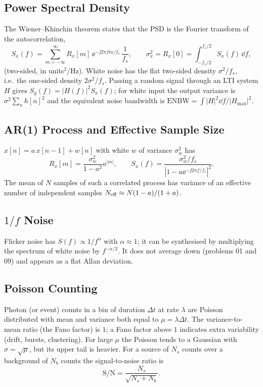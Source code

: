 \documentclass[11pt,a4paper]{article}
\begin{document}
\subsection{Power Spectral Density}
The Wiener--Khinchin theorem states that the PSD is the Fourier transform of the autocorrelation,
\begin{equation}
  S_x(f)=\sum_{m=-\infty}^{\infty}R_x[m]\,\ee^{-\jj2\pi fm/f_s}\,\frac1{f_s},\qquad
  \sigma_x^2=R_x[0]=\int_{-f_s/2}^{f_s/2}S_x(f)\,\dd f,
  \label{eq:wk}
\end{equation}
(two-sided, in units$^2$/Hz). White noise has the flat two-sided density $\sigma^2/f_s$, i.e.\ the one-sided density $2\sigma^2/f_s$. Passing a random signal through an LTI system $H$ gives $S_y(f)=|H(f)|^2S_x(f)$; for white input the output variance is $\sigma^2\sum_n h[n]^2$ and the equivalent noise bandwidth is $\mathrm{ENBW}=\int|H|^2\dd f/|H_{\max}|^2$.

\subsection{AR(1) Process and Effective Sample Size}
$x[n]=a\,x[n-1]+w[n]$ with white $w$ of variance $\sigma_w^2$ has
\begin{equation}
  R_x[m]=\frac{\sigma_w^2}{1-a^2}a^{|m|},\qquad S_x(f)=\frac{\sigma_w^2/f_s}{|1-a\ee^{-\jj2\pi f/f_s}|^2}.
  \label{eq:ar1}
\end{equation}
The mean of $N$ samples of such a correlated process has variance of an effective number of independent samples $N_{\rm eff}\approx N(1-a)/(1+a)$.

\subsection{$1/f$ Noise}
Flicker noise has $S(f)\propto1/f^{\alpha}$ with $\alpha\approx1$; it can be synthesised by multiplying the spectrum of white noise by $f^{-\alpha/2}$. It does not average down (problems 01 and 09) and appears as a flat Allan deviation.

\subsection{Poisson Counting}
Photon (or event) counts in a bin of duration $\Delta t$ at rate $\lambda$ are Poisson distributed with mean and variance both equal to $\mu=\lambda\Delta t$. The variance-to-mean ratio (the Fano factor) is $1$; a Fano factor above $1$ indicates extra variability (drift, bursts, clustering). For large $\mu$ the Poisson tends to a Gaussian with $\sigma=\sqrt\mu$, but its upper tail is heavier. For a source of $N_s$ counts over a background of $N_b$ counts the signal-to-noise ratio is
\begin{equation}
  \mathrm{S/N}=\frac{N_s}{\sqrt{N_s+N_b}}.
  \label{eq:poisson}
\end{equation}
\end{document}
